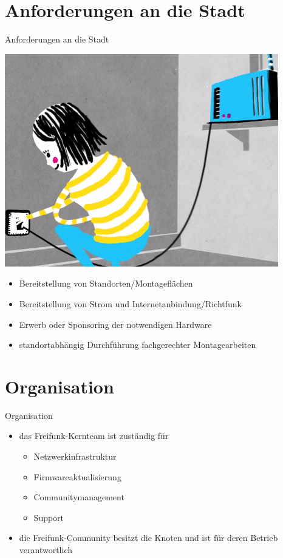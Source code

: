 \documentclass{beamer}
\begin{document}
\section{Anforderungen an die Stadt}
\begin{frame}{Anforderungen an die Stadt}
\vfill
\begin{center}
\includegraphics[height=0.4\textheight]{images/setup}$\;$
\vfill
\end{center}
\begin{itemize}
\item Bereitstellung von Standorten/Montageflächen
\item Bereitstellung von Strom und Internetanbindung/Richtfunk
\item Erwerb oder Sponsoring der notwendigen Hardware
\item standortabhängig Durchführung fachgerechter Montagearbeiten
\end{itemize}
\vfill
\end{frame}

\section{Organisation}
\begin{frame}{Organisation}
\vfill
\begin{itemize}
\item das Freifunk-Kernteam ist zuständig für
	\begin{itemize}
	\item Netzwerkinfrastruktur
	\item Firmwareaktualisierung
	\item Communitymanagement
	\item Support
	\end{itemize}
\vfill
\item die Freifunk-Community besitzt die Knoten und ist für deren Betrieb verantwortlich
\end{itemize}
\vfill
\end{frame}
\end{document}
